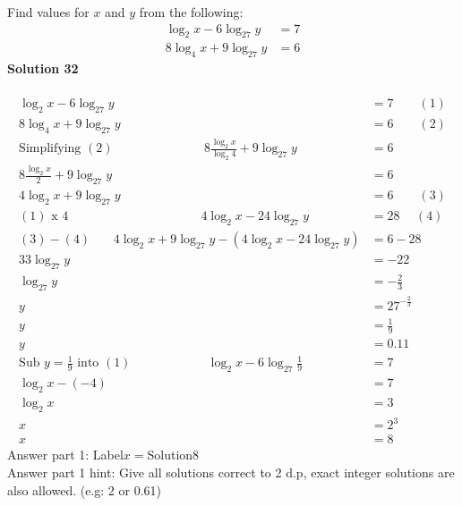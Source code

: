 \documentclass{article}
\begin{document}
Find values for $x$ and $y$ from the following:
\begin{align*}
\log_{2}x-6\log_{27}y&=7\\[2pt]
8\log_{4}x+9\log_{27}y&=6
\end{align*}
\noindent\textbf{Solution 32}\\[2pt]
\\[-35pt]\begin{align*}
\log_{2}x-6\log_{27}y&=7\qquad (1)\\[2pt]
8\log_{4}x+9\log_{27}y&=6\qquad (2)\\[2pt]
\text{Simplifying}\,\,(2)\hspace{87pt}8\displaystyle\frac{\log_{2}x}{\log_{2}4}+9\log_{27}y&=6\\[2pt]
8\displaystyle\frac{\log_{2}x}{2}+9\log_{27}y&=6\\[2pt]
4\log_{2}x+9\log_{27}y&=6\qquad (3)\\[2pt]
(1)\,\,\text{x}\,\,4\hspace{127pt} 4\log_{2}x-24\log_{27}y&=28\hspace{15pt} (4)\\[2pt]
(3)-(4)\hspace{22pt}4\log_{2}x+9\log_{27}y-(4\log_{2}x-24\log_{27}y)&=6-28\\[2pt]
33\log_{27}y&=-22\\[2pt]
\log_{27}y&=-\displaystyle\frac{2}{3}\\[2pt]
y&=27^{-\frac{2}{3}}\\[2pt]
y&=\displaystyle\frac{1}{9}\\[2pt]
y&=0.11\\[12pt]
\text{Sub}\,\,y=\displaystyle\frac{1}{9}\,\,\text{into}\,\,(1)\hspace{73pt}\log_{2}x-6\log_{27}\displaystyle\frac{1}{9}&=7\\[2pt]
\log_{2}x-(-4)&=7\\[2pt]
\log_{2}x&=3\\[2pt]
x&=2^3\\[2pt]
x&=8
\end{align*}
Answer part 1: \hspace{10pt}Label\hspace{10pt}$x=$\hspace{10pt}Solution\hspace{10pt}8\\
Answer part 1 hint: \hspace{15pt}Give all solutions correct to 2 d.p, exact integer solutions are also allowed. (e.g: 2 or 0.61)\\
\end{document}
